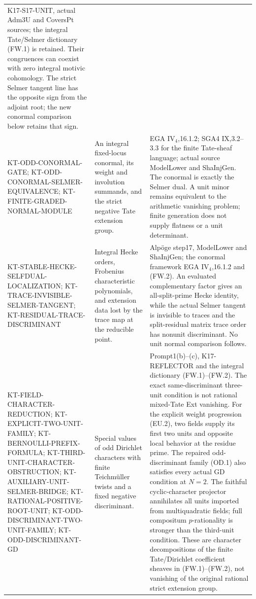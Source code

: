 \begin{longtable}{>{\raggedright\arraybackslash}p{}
>{\raggedright\arraybackslash}p{}
>{\raggedright\arraybackslash}p{}}
K17-S17-UNIT, actual Adm3U and CoversPt sources; the integral
Tate/Selmer dictionary (FW.1) is retained. Their congruences
can coexist with zero integral motivic cohomology. The strict
Selmer tangent line has the opposite sign from the adjoint
root; the new conormal comparison below retains that sign.\\
KT-ODD-CONORMAL-GATE; KT-ODD-CONORMAL-SELMER-EQUIVALENCE;
KT-FINITE-GRADED-NORMAL-MODULE &
An integral fixed-locus conormal, its weight and involution
summands, and the strict negative Tate extension group. &
EGA IV$_4$,16.1.2; SGA4 IX,3.2--3.3 for the finite Tate-sheaf
language; actual source ModelLower and ShaInjGen.
The conormal is exactly the Selmer dual. A unit minor remains
equivalent to the arithmetic vanishing problem; finite
generation does not supply flatness or a unit determinant.\\
KT-STABLE-HECKE-SELFDUAL-LOCALIZATION;
KT-TRACE-INVISIBLE-SELMER-TANGENT;
KT-RESIDUAL-TRACE-DISCRIMINANT &
Integral Hecke orders, Frobenius characteristic polynomials,
and extension data lost by the trace map at the reducible point. &
Alp\"oge step17, ModelLower and ShaInjGen; the conormal
framework EGA IV$_4$,16.1.2 and (FW.2).
An evaluated complementary factor gives an all-split-prime
Hecke identity, while the actual Selmer tangent is invisible
to traces and the split-residual matrix trace order has
nonunit discriminant. No unit normal comparison follows.\\
KT-FIELD-CHARACTER-REDUCTION; KT-EXPLICIT-TWO-UNIT-FAMILY;
KT-BERNOULLI-PREFIX-FORMULA; KT-THIRD-UNIT-CHARACTER-OBSTRUCTION;
KT-AUXILIARY-UNIT-SELMER-BRIDGE; KT-RATIONAL-POSITIVE-ROOT-UNIT;
KT-ODD-DISCRIMINANT-TWO-UNIT-FAMILY; KT-ODD-DISCRIMINANT-GD &
Special values of odd Dirichlet characters with finite
Teichm\"uller twists and a fixed negative discriminant. &
Prompt1(b)--(c), K17-REFLECTOR and the integral dictionary
(FW.1)--(FW.2). The exact same-discriminant three-unit
condition is not rational mixed-Tate Ext vanishing.
For the explicit weight progression (EU.2), two fields
supply its first two units and opposite local behavior
at the residue prime. The repaired odd-discriminant family
(OD.1) also satisfies every actual GD condition at $N=2$. The faithful cyclic-character projector
annihilates all units imported from multiquadratic fields; full
compositum $p$-rationality is stronger than the third-unit condition.
These are character decompositions of the finite Tate/Dirichlet
coefficient sheaves in (FW.1)--(FW.2), not vanishing of the
original rational strict extension group.\\

\end{longtable}
